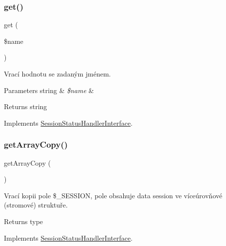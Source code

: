\subsubsection{\texorpdfstring{get()}{get()}}
{\footnotesize\ttfamily get (\begin{DoxyParamCaption}\item[{}]{\$name }\end{DoxyParamCaption})}

Vrací hodnotu se zadaným jménem.


\begin{DoxyParams}[1]{Parameters}
string & {\em \$name} & \\
\hline
\end{DoxyParams}
\begin{DoxyReturn}{Returns}
string 
\end{DoxyReturn}


Implements \mbox{\hyperlink{interface_pes_1_1_session_1_1_session_status_handler_interface}{Session\+Status\+Handler\+Interface}}.

\mbox{\label{class_pes_1_1_session_1_1_session_status_handler_a9c9bae4e44ee76a926fa7ecdc49dd8b5}} 
\subsubsection{\texorpdfstring{get\+Array\+Copy()}{getArrayCopy()}}
{\footnotesize\ttfamily get\+Array\+Copy (\begin{DoxyParamCaption}{ }\end{DoxyParamCaption})}

Vrací kopii pole \$\+\_\+\+S\+E\+S\+S\+I\+ON, pole obsahuje data session ve víceúrovňové (stromové) struktuře. \begin{DoxyReturn}{Returns}
type 
\end{DoxyReturn}


Implements \mbox{\hyperlink{interface_pes_1_1_session_1_1_session_status_handler_interface}{Session\+Status\+Handler\+Interface}}.

\mbox{\label{class_pes_1_1_session_1_1_session_status_handler_a8af92ba90a86c8c4abaf02cc314440f1}} 
